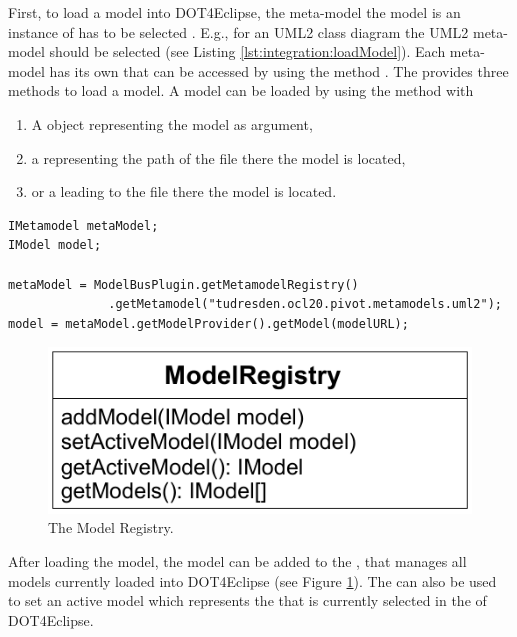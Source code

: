 First, to load a model into \acl{DOT4Eclipse}, the meta-model the model is an instance of has to be selected . E.g., for an \acs{UML}2 class diagram the \acs{UML}2 meta-model should be selected (see Listing \ref{lst:integration:loadModel}). Each meta-model has its own  that can be accessed by using the method . The  provides three methods to load a model. A model can be loaded by using the method  with

\begin{enumerate}
	\item A  object representing the model as argument,
	\item a  representing the path of the file there the model is located,
	\item or a  leading to the file there the model is located.
\end{enumerate}

\lstset{
  language=Java
}
\begin{lstlisting}[caption={How to load a model.}, captionpos=b, label=lst:integration:loadModel, float]
IMetamodel metaModel;
IModel model;

metaModel = ModelBusPlugin.getMetamodelRegistry()
              .getMetamodel("tudresden.ocl20.pivot.metamodels.uml2");
model = metaModel.getModelProvider().getModel(modelURL);
\end{lstlisting}

\begin{figure}[!b]
	\centering
	\includegraphics[width=.55\linewidth]{figures/integration/modelRegistry}
	\caption{The Model Registry.}
	\label{pic:integration:modelRegistry}
\end{figure}

After loading the model, the model can be added to the , that manages all models currently loaded into \acl{DOT4Eclipse} (see Figure \ref{pic:integration:modelRegistry}). The  can also be used to set an active model which represents the  that is currently selected in the  of \acl{DOT4Eclipse}.


